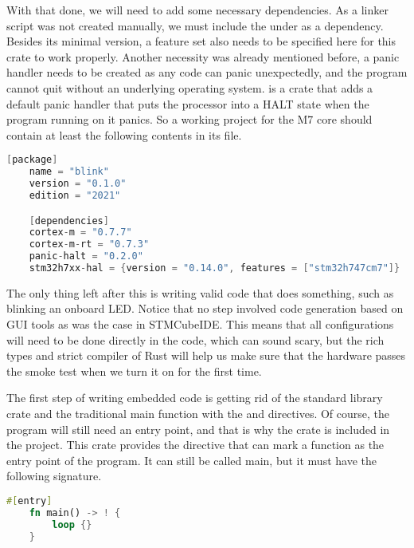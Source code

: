 With that done, we will need to add some necessary dependencies. As a  linker script was not created manually, we must include the  under as a dependency. Besides its minimal version, a feature set also needs to be specified here for this crate to work properly. Another necessity was already mentioned before, a panic handler needs to be created as any code can panic unexpectedly, and the program cannot quit without an underlying operating system.  is a crate that adds a default panic handler that puts the processor into a HALT state when the program running on it panics. So a working project for the M7 core should contain at least the following contents in its  file.

\begin{lstlisting}[language=C,frame=single,float=!ht,label={lst:cargo-toml},caption={Cargo.toml File of the Project}]
    [package]
    name = "blink"
    version = "0.1.0"
    edition = "2021"

    [dependencies]
    cortex-m = "0.7.7"
    cortex-m-rt = "0.7.3"
    panic-halt = "0.2.0"
    stm32h7xx-hal = {version = "0.14.0", features = ["stm32h747cm7"]}
\end{lstlisting}

The only thing left after this is writing valid code that does something, such as blinking an onboard LED. Notice that no step involved code generation based on GUI tools as was the case in STMCubeIDE. This means that all configurations will need to be done directly in the code, which can sound scary, but the rich types and strict compiler of Rust will help us make sure that the hardware passes the smoke test when we turn it on for the first time.

The first step of writing embedded code is getting rid of the standard library crate and the traditional main function with the \mycode{#![no_std]} and \mycode{#![no_main]} directives. Of course, the program will still need an entry point, and that is why the  crate is included in the project. This crate provides the \mycode{#[entry]} directive that can mark a function as the entry point of the program. It can still be called main, but it must have the following signature.

\begin{lstlisting}[language=Rust,frame=single,float=!ht,style=customrust,label={lst:embedded-main},caption={Main Function in Embedded Rust}]
    #[entry]
    fn main() -> ! {
        loop {}
    }
\end{lstlisting}

